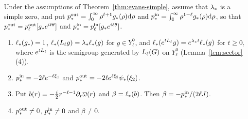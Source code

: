 \begin{lemma}
\label{lem:adjoint}
Under the assumptions of Theorem~\ref{thm:evans-simple}, assume that $\lambda_*$ is
a simple zero, and put
$p^{\mathrm{out}}_*=\int_0^\infty\rho^{\ell+1}g_*(\rho)\dd\rho$ and
$p^{\mathrm{in}}_*=\int_0^\infty\rho^{1-\ell}g_*(\rho)\dd\rho$, so that
$p^{\mathrm{out}}_*=p^{\mathrm{out}}_\ell[g_*e^{i\ell\theta}]$ and $p^{\mathrm{in}}_*=p^{\mathrm{in}}_\ell[g_*e^{i\ell\theta}]$.
\begin{enumerate}[label=\textup{(\arabic*)}]
\item $\ell_*(g_*)=1$, $\ell_*(L_{\ell}g)=\lambda_*\ell_*(g)$ for $g\in Y^0_\ell$,
  and $\ell_*(e^{tL_{\ell}}g)=e^{\lambda_* t}\ell_*(g)$ for $t\ge0$, where
  $e^{tL_{\ell}}$ is the semigroup generated by $L_{\ell}(G)$ on $Y^0_\ell$
  \textup{(}Lemma~\ref{lem:sector}(4)\textup{)}.
\item $p^{\mathrm{in}}_*=-2\ell e^{-\ell\xi_1}$ and $p^{\mathrm{out}}_*=-2\ell e^{\ell\xi_2}\psi_*(\xi_2)$.
\item Put $b(r)=-\frac i2r^{-\ell-1}\partial_r\overline{\omega}(r)$ and $\beta=\ell_*(b)$. Then
  $\beta=-p^{\mathrm{in}}_*/(2\ell J)$.
\item $p^{\mathrm{out}}_*\ne0$, $p^{\mathrm{in}}_*\ne0$ and $\beta\ne0$.
\end{enumerate}
\end{lemma}
